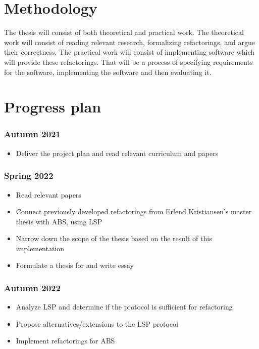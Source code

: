 \documentclass[11pt]{article}
\begin{document}
\section*{Methodology}

The thesis will consist of both theoretical and practical work. The theoretical work will
consist of reading relevant research, formalizing refactorings, and argue their
correctness. The practical work will consist of implementing software which will provide
these refactorings. That will be a process of specifying requirements for the software,
implementing the software and then evaluating it.

\vspace{-0.5cm}
\section*{Progress plan}

\subsubsection*{Autumn 2021}
\begin{itemize}
    \itemsep0em
    \item Deliver the project plan and read relevant curriculum and papers
\end{itemize}
\subsubsection*{Spring 2022}
\vspace{-0.25cm}
\begin{itemize}
    \itemsep0em
    \item Read relevant papers
    \item Connect previously developed refactorings from Erlend Kristiansen's master
        thesis\textsubscript{\cite{DBLP:conf/nik/KristiansenS14}} with ABS, using LSP
    \item Narrow down the scope of the thesis based on the result of this implementation
    \item Formulate a thesis for and write essay
\end{itemize}
\vspace{-0.25cm}
\subsubsection*{Autumn 2022}
\vspace{-0.5cm}
\begin{itemize}
    \itemsep0em
    \item Analyze LSP and determine if the protocol is sufficient for refactoring
    \item Propose alternatives/extensions to the LSP protocol
    \item Implement refactorings for ABS 
\end{itemize}
\vspace{-0.25cm}
\end{document}
